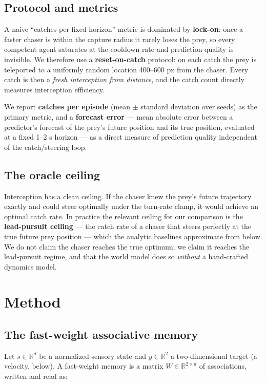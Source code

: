 \documentclass[11pt]{article}
\begin{document}
\subsection{Protocol and metrics}

A naive ``catches per fixed horizon'' metric is dominated by \textbf{lock-on}: once a faster
chaser is within the capture radius it rarely loses the prey, so every competent agent
saturates at the cooldown rate and prediction quality is invisible. We therefore use a
\textbf{reset-on-catch} protocol: on each catch the prey is teleported to a uniformly random
location 400--600 px from the chaser. Every catch is then a \emph{fresh interception from
distance}, and the catch count directly measures interception efficiency.

We report \textbf{catches per episode} (mean $\pm$ standard deviation over seeds) as the
primary metric, and a \textbf{forecast error} --- mean absolute error between a predictor's
forecast of the prey's future position and its true position, evaluated at a fixed 1--2 s
horizon --- as a direct measure of prediction quality independent of the catch/steering loop.

\subsection{The oracle ceiling}

Interception has a clean ceiling. If the chaser knew the prey's future trajectory exactly and
could steer optimally under the turn-rate clamp, it would achieve an optimal catch rate. In
practice the relevant ceiling for our comparison is the \textbf{lead-pursuit ceiling} --- the
catch rate of a chaser that steers perfectly at the true future prey position --- which the
analytic baselines approximate from below. We do not claim the chaser reaches the true optimum;
we claim it reaches the lead-pursuit regime, and that the world model does so \emph{without} a
hand-crafted dynamics model.

\section{Method}\label{sec:method}

\subsection{The fast-weight associative memory}

Let $s \in \mathbb{R}^{d}$ be a normalized sensory state and $y \in \mathbb{R}^{2}$ a
two-dimensional target (a velocity, below). A fast-weight memory is a matrix
$W \in \mathbb{R}^{2 \times d}$ of associations, written and read as:
\end{document}
